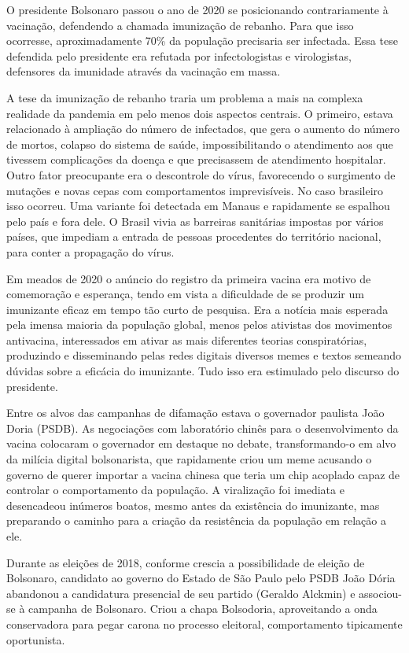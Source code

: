 O presidente Bolsonaro passou o ano de 2020 se posicionando
contrariamente à vacinação, defendendo a chamada imunização de rebanho.
Para que isso ocorresse, aproximadamente 70\% da população precisaria
ser infectada. Essa tese defendida pelo presidente era refutada por
infectologistas e virologistas, defensores da imunidade através da
vacinação em massa.

A tese da imunização de rebanho traria um problema a mais na complexa
realidade da pandemia em pelo menos dois aspectos centrais. O primeiro,
estava relacionado à ampliação do número de infectados, que gera o
aumento do número de mortos, colapso do sistema de saúde,
impossibilitando o atendimento aos que tivessem complicações da doença e
que precisassem de atendimento hospitalar. Outro fator preocupante era o
descontrole do vírus, favorecendo o surgimento de mutações e novas cepas
com comportamentos imprevisíveis. No caso brasileiro isso ocorreu. Uma
variante foi detectada em Manaus e rapidamente se espalhou pelo país e
fora dele. O Brasil vivia as barreiras sanitárias impostas por vários
países, que impediam a entrada de pessoas procedentes do território
nacional, para conter a propagação do vírus.

Em meados de 2020 o anúncio do registro da primeira vacina era motivo de
comemoração e esperança, tendo em vista a dificuldade de se produzir um
imunizante eficaz em tempo tão curto de pesquisa. Era a notícia mais
esperada pela imensa maioria da população global, menos pelos ativistas
dos movimentos antivacina, interessados em ativar as mais diferentes
teorias conspiratórias, produzindo e disseminando pelas redes digitais
diversos memes e textos semeando dúvidas sobre a eficácia do imunizante.
Tudo isso era estimulado pelo discurso do presidente.

Entre os alvos das campanhas de difamação estava o governador paulista
João Doria (PSDB). As negociações com laboratório chinês para o
desenvolvimento da vacina colocaram o governador em destaque no debate,
transformando-o em alvo da milícia digital bolsonarista, que rapidamente
criou um meme acusando o governo de querer importar a vacina chinesa que
teria um chip acoplado capaz de controlar o comportamento da população.
A viralização foi imediata e desencadeou inúmeros boatos, mesmo antes da
existência do imunizante, mas preparando o caminho para a criação da
resistência da população em relação a ele.

Durante as eleições de 2018, conforme crescia a possibilidade de eleição
de Bolsonaro, candidato ao governo do Estado de São Paulo pelo PSDB João
Dória abandonou a candidatura presencial de seu partido (Geraldo
Alckmin) e associou-se à campanha de Bolsonaro. Criou a chapa
Bolsodoria, aproveitando a onda conservadora para pegar carona no
processo eleitoral, comportamento tipicamente oportunista.

